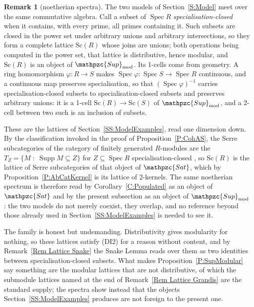 \documentclass[reqno,a4paper]{amsart}
\numberwithin{equation}{section}
\theoremstyle{plain}
\theoremstyle{definition}
\newtheorem{remark}[subsection]{Remark}
\def\nameit#1{\textrm{#1}~}
\def\prox{\nameit{Proposition}}
\def\corx{\nameit{Corollary}}
\def\remx{\nameit{Remark}}
\def\dfn#1{{\itshape #1}}
\def\phi{\varphi}
\newcommand{\catfont}[1]{\ensuremath{\mathpzc{#1}}\xspace}
\newcommand{\Sat}{\catfont{Sat}}
\newcommand{\Supmod}{\ensuremath{\mathpzc{Sup}_{\mathrm{mod}}}}
\renewcommand{\1}{\onecat{1}}
\newcommand{\Scl}{\ensuremath{\mathrm{Sc}}}
\DeclareMathOperator{\Spec}{Spec}
\DeclareMathOperator{\Supp}{Supp}
\begin{document}
\begin{remark}[noetherian spectra]\label{Rem Lattice Spectra}
	The two models of Section~\ref{S:Model} meet over the same commutative algebra. Call a subset of \(\Spec R\) \dfn{specialisation-closed} when it contains, with every prime, all primes containing it. Such subsets are closed in the power set under arbitrary unions and arbitrary intersections, so they form a complete lattice \(\Scl(R)\) whose joins are unions; both operations being computed in the power set, that lattice is distributive, hence modular, and \(\Scl(R)\) is an object of \(\Supmod\). Its 1-cells come from geometry. A ring homomorphism \(\phi\colon R\to S\) makes \(\Spec\phi\colon\Spec S\to\Spec R\) continuous, and a continuous map preserves specialisation, so that \((\Spec\phi)^{-1}\) carries specialisation-closed subsets to specialisation-closed subsets and preserves arbitrary unions: it is a 1-cell \(\Scl(R)\to\Scl(S)\) of \(\Supmod\), and a 2-cell between two such is an inclusion of subsets.

	These are the lattices of Section~\ref{SS:ModelExamples}, read one dimension down. By the classification invoked in the proof of \prox\ref{P:CohAS}, the Serre subcategories of the category of finitely generated \(R\)-modules are the \(T_{Z}=\{M\;:\;\Supp M\subseteq Z\}\) for \(Z\subseteq\Spec R\) specialisation-closed \cite[Proposition~VI.2.4]{Gabriel62}, so \(\Scl(R)\) is the lattice of Serre subcategories of that object of \(\Sat\), which by \prox\ref{P:AbCatKernel} is its lattice of 2-kernels. The same noetherian spectrum is therefore read by \corx\ref{C:Populated} as an object of \(\Sat\) and by the present subsection as an object of \(\Supmod\): the two models do not merely coexist, they overlap, and no reference beyond those already used in Section~\ref{SS:ModelExamples} is needed to see it.

	The family is honest but undemanding. Distributivity gives modularity for nothing, so these lattices satisfy \textup{(DI2)} for a reason without content, and by \remx\ref{Rem Lattice Snake} the Snake Lemma reads over them as two identities between specialisation-closed subsets. What makes \prox\ref{P:SupModular} say something are the modular lattices that are not distributive, of which the submodule lattices named at the end of \remx\ref{Rem Lattice Grandis} are the standard supply; the spectra show instead that the objects Section~\ref{SS:ModelExamples} produces are not foreign to the present one.
\end{remark}
\end{document}
